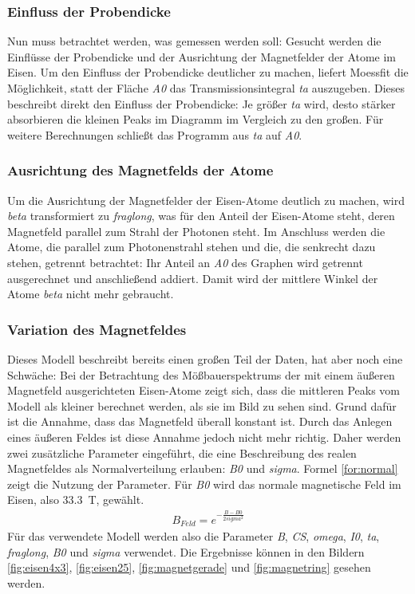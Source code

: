 \documentclass[german, %
parskip=full, %
bibliography=totoc, %
]{scrartcl}
\begin{document}
\subsubsection{Einfluss der Probendicke}

Nun muss betrachtet werden, was gemessen werden soll: Gesucht werden die Einflüsse der Probendicke und der Ausrichtung der Magnetfelder der Atome im Eisen. Um den Einfluss der Probendicke deutlicher zu machen, liefert Moessfit die Möglichkeit, statt der Fläche \textit{A0} das Transmissionsintegral \textit{ta} auszugeben. Dieses beschreibt direkt den Einfluss der Probendicke: Je größer \textit{ta} wird, desto stärker absorbieren die kleinen Peaks im Diagramm im Vergleich zu den großen. Für weitere Berechnungen schließt das Programm aus \textit{ta} auf \textit{A0}. 

\subsubsection{Ausrichtung des Magnetfelds der Atome}

Um die  Ausrichtung der Magnetfelder der Eisen-Atome deutlich zu machen, wird \textit{beta} transformiert zu \textit{fraglong}, was für den Anteil der Eisen-Atome steht, deren Magnetfeld parallel zum Strahl der Photonen steht. Im Anschluss werden die Atome, die parallel zum Photonenstrahl stehen und die, die senkrecht dazu stehen, getrennt betrachtet: Ihr Anteil an \textit{A0} des Graphen wird getrennt ausgerechnet und anschließend addiert. Damit wird der mittlere Winkel der Atome \textit{beta} nicht mehr gebraucht. 

\subsubsection{Variation des Magnetfeldes}

Dieses Modell beschreibt bereits einen großen Teil der Daten, hat aber noch eine Schwäche: Bei der Betrachtung des Mößbauerspektrums der mit einem äußeren Magnetfeld ausgerichteten Eisen-Atome zeigt sich, dass die mittleren Peaks vom Modell als kleiner berechnet werden, als sie im Bild zu sehen sind. Grund dafür ist die Annahme, dass das Magnetfeld überall konstant ist. Durch das Anlegen eines äußeren Feldes ist diese Annahme jedoch nicht mehr richtig. Daher werden zwei zusätzliche Parameter eingeführt, die eine Beschreibung des realen Magnetfeldes als Normalverteilung erlauben: \textit{B0} und \textit{sigma}. Formel \ref{for:normal} zeigt die Nutzung der Parameter. Für \textit{B0} wird das normale magnetische Feld im Eisen, also \SI{33.3}{\tesla}, gewählt.
\begin{align}
B_{Feld} = e^{-\frac{B-B0}{2sigma^2}} \label{for:normal}
\end{align} 
Für das verwendete Modell werden also die Parameter \textit{B}, \textit{CS}, \textit{omega}, \textit{I0}, \textit{ta}, \textit{fraglong}, \textit{B0} und \textit{sigma} verwendet. Die Ergebnisse können in den Bildern \ref{fig:eisen4x3}, \ref{fig:eisen25}, \ref{fig:magnetgerade} und \ref{fig:magnetring} gesehen werden.
\end{document}
